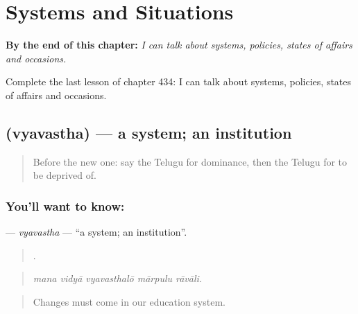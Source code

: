 
\chapter{Systems and Situations}
\label{ch:te-systems-and-situations}

\begin{chapteropening}
\textbf{By the end of this chapter:} \emph{I can talk about systems, policies, states of affairs and occasions.}

Complete the last lesson of chapter 434: I can talk about systems, policies, states of affairs and occasions.
\end{chapteropening}

\section[\texorpdfstring{\te{వ్యవస్థ} (vyavastha)}{వ్యవస్థ (vyavastha)}]{ (vyavastha) — a system; an institution}

\label{lesson:TE-C434-vyavastha}



\begin{quote}
Before the new one: say the Telugu for dominance, then the Telugu for to be deprived of.
\end{quote}

\subsection*{You'll want to know: }
\textbf{} — \emph{vyavastha} — \textquotedblleft{}a system; an institution\textquotedblright{}.

\begin{quote}
    .
\end{quote}

\begin{quote}
\emph{mana vidyā vyavasthalō mārpulu rāvāli.}
\end{quote}

\begin{quote}
Changes must come in our education system.
\end{quote}


